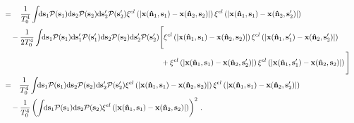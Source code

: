 \documentclass[fleqn,usenatbib]{mnras}
\begin{document}
\begin{align}
            \\
            &= 
                \phantom{+}\,\frac{1}{T_0^4} \int\!\! \dif{\mbf{s}_1} \mcal{P}(\mbf{s}_1) \dif{\mbf{s}_2} \mcal{P}(\mbf{s}_2) \dif{\mbf{s}'_2} \mcal{P}(\mbf{s}'_2)
                    \xi^{el}\left(\norm{ \mbf{x}(\nhat_1,\mbf{s}_1) - \mbf{x}(\nhat_2,\mbf{s}_2) }\right)
                    \xi^{el}\left(\norm{ \mbf{x}(\nhat_1,\mbf{s}_1) - \mbf{x}(\nhat_2,\mbf{s}'_2) }\right)
                \nonumber \\ & \quad
                - \frac{1}{2 T_0^4} \int\!\! \dif{\mbf{s}_1} \mcal{P}(\mbf{s}_1) \dif{\mbf{s}'_1} \mcal{P}(\mbf{s}'_1) \dif{\mbf{s}_2} \mcal{P}(\mbf{s}_2) \dif{\mbf{s}'_2} \mcal{P}(\mbf{s}'_2)
                    \Bigg[
                    \xi^{el}\left(\norm{ \mbf{x}(\nhat_1,\mbf{s}_1) - \mbf{x}(\nhat_2,\mbf{s}_2) }\right)
                    \xi^{el}\left(\norm{ \mbf{x}(\nhat_1,\mbf{s}'_1) - \mbf{x}(\nhat_2,\mbf{s}'_2) }\right)
                     \nonumber \\ & \qquad\qquad\qquad\qquad\qquad\qquad\qquad\qquad\qquad\qquad\quad
                    +
                    \xi^{el}\left(\norm{ \mbf{x}(\nhat_1,\mbf{s}_1) - \mbf{x}(\nhat_2,\mbf{s}'_2) }\right)
                    \xi^{el}\left(\norm{ \mbf{x}(\nhat_1,\mbf{s}'_1) - \mbf{x}(\nhat_2,\mbf{s}_2) }\right)
                \Bigg] \nonumber
            \\
            &= 
                \phantom{+}\frac{1}{T_0^4} \int\!\! \dif{\mbf{s}_1} \mcal{P}(\mbf{s}_1) \dif{\mbf{s}_2} \mcal{P}(\mbf{s}_2) \dif{\mbf{s}'_2} \mcal{P}(\mbf{s}'_2)
                    \xi^{el}\left(\norm{ \mbf{x}(\nhat_1,\mbf{s}_1) - \mbf{x}(\nhat_2,\mbf{s}_2) }\right)
                    \xi^{el}\left(\norm{ \mbf{x}(\nhat_1,\mbf{s}_1) - \mbf{x}(\nhat_2,\mbf{s}'_2) }\right)
                \nonumber \\ & \quad
                - \frac{1}{T_0^4} \left( \int\!\! \dif{\mbf{s}_1} \mcal{P}(\mbf{s}_1) \dif{\mbf{s}_2} \mcal{P}(\mbf{s}_2)
                    \xi^{el}\left(\norm{ \mbf{x}(\nhat_1,\mbf{s}_1) - \mbf{x}(\nhat_2,\mbf{s}_2) }\right)
                    \right)^2 \,.
                \nonumber
    \end{align}



\label{lastpage}
\end{document}

